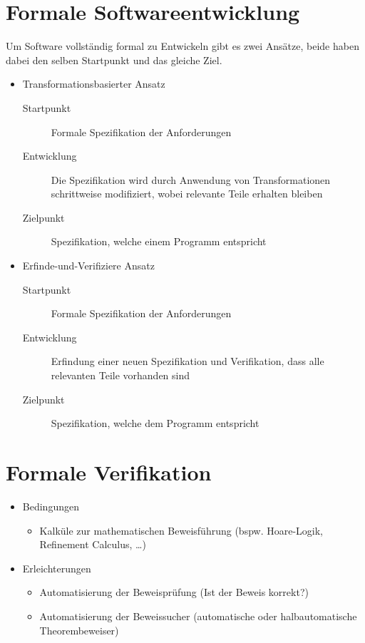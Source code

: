 \documentclass[a4paper, 11pt, accentcolor = tud3b]{tudreport}
\begin{document}
	    \section{Formale Softwareentwicklung}
		    Um Software vollständig formal zu Entwickeln gibt es zwei Ansätze, beide haben dabei den selben Startpunkt und das gleiche Ziel.
		    \begin{itemize}
		    	\item Transformationsbasierter Ansatz
			    	\begin{description}
			    		\item[Startpunkt] Formale Spezifikation der Anforderungen
			    		\item[Entwicklung] Die Spezifikation wird durch Anwendung von Transformationen schrittweise modifiziert, wobei relevante Teile erhalten bleiben
			    		\item[Zielpunkt] Spezifikation, welche einem Programm entspricht
			    	\end{description}
		    	\item Erfinde-und-Verifiziere Ansatz
			    	\begin{description}
			    		\item[Startpunkt] Formale Spezifikation der Anforderungen
			    		\item[Entwicklung] Erfindung einer neuen Spezifikation und Verifikation, dass alle relevanten Teile vorhanden sind
			    		\item[Zielpunkt] Spezifikation, welche dem Programm entspricht
			    	\end{description}
		    \end{itemize}
	    
	    \section{Formale Verifikation}
		    \begin{itemize}
		    	\item Bedingungen
			    	\begin{itemize}
			    		\item Kalküle zur mathematischen Beweisführung (bspw. Hoare-Logik, Refinement Calculus, \dots)
			    	\end{itemize}
			    \item Erleichterungen
				    \begin{itemize}
				    	\item Automatisierung der Beweisprüfung (Ist der Beweis korrekt?)
				    	\item Automatisierung der Beweissucher (automatische oder halbautomatische Theorembeweiser)
				    \end{itemize}
		    \end{itemize}
	    
\end{document}
